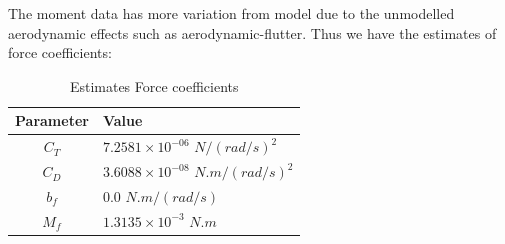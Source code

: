 The moment data has more variation from model due to the unmodelled aerodynamic effects such as aerodynamic-flutter. Thus we have the estimates of force coefficients:

\begin{table}[H]
    \centering
    \begin{tabular}{c l}
        \hline \hline
        Parameter & Value \\ \hline \hline
        $C_T$ & $7.2581 \times 10^{-06}$ $N/(rad/s)^2$  \\
        $C_D$ & $3.6088 \times 10^{-08}$ $N.m/(rad/s)^2$ \\
        $b_f$ & $0.0$ $N.m/(rad/s)$\\
        $M_f$ & $1.3135 \times 10^{-3}$ $N.m$\\ \hline \hline
    \end{tabular}
    \caption{Estimates Force coefficients}
\end{table}

